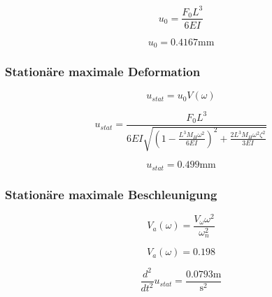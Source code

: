\documentclass[
  letterpaper,
  DIV=11]{scrreprt}
\begin{document}
\begin{equation}u_{0} = \frac{F_{0} L^{3}}{6 E I}\end{equation}

\begin{equation}u_{0} = 0.4167 \text{mm}\end{equation}

\hypertarget{stationuxe4re-maximale-deformation}{%
\subsubsection{Stationäre maximale
Deformation}\label{stationuxe4re-maximale-deformation}}

\begin{equation}u_{stat} = u_{0} V{\left(\omega \right)}\end{equation}

\begin{equation}u_{stat} = \frac{F_{0} L^{3}}{6 E I \sqrt{\left(1 - \frac{L^{3} M_{H} \omega^{2}}{6 E I}\right)^{2} + \frac{2 L^{3} M_{H} \omega^{2} \zeta^{2}}{3 E I}}}\end{equation}

\begin{equation}u_{stat} = 0.499 \text{mm}\end{equation}

\hypertarget{stationuxe4re-maximale-beschleunigung}{%
\subsubsection{Stationäre maximale
Beschleunigung}\label{stationuxe4re-maximale-beschleunigung}}

\begin{equation}V_{a}{\left(\omega \right)} = \frac{V_{\omega} \omega^{2}}{\omega_{n}^{2}}\end{equation}

\begin{equation}V_{a}{\left(\omega \right)} = 0.198\end{equation}

\begin{equation}\frac{d^{2}}{d t^{2}} u_{stat} = \frac{0.0793 \text{m}}{\text{s}^{2}}\end{equation}
\end{document}
